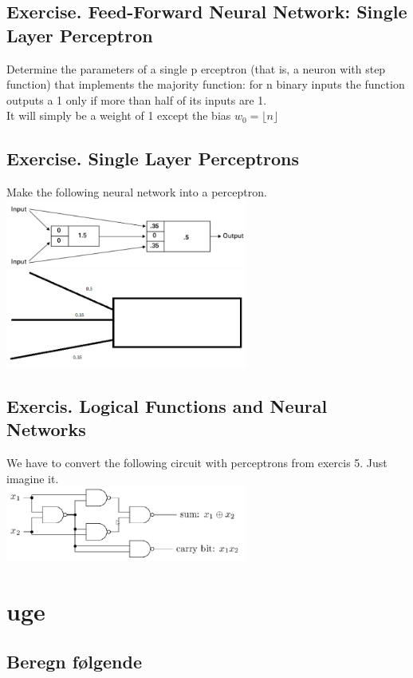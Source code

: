 \documentclass[12pt, a4paper]{article}
\begin{document}
		\subsection{Exercise. Feed-Forward Neural Network: Single Layer Perceptron}
			Determine the parameters of a single p erceptron (that is, a neuron with step function) that implements the majority function: for n binary inputs the function outputs a 1 only if more than half of its inputs are 1.\\
			It will simply be a weight of 1 except the bias $w_0=\lfloor n \rfloor$
		\subsection{Exercise. Single Layer Perceptrons}
			Make the following neural network into a perceptron.\\
			\includegraphics[width=300px]{images/41,1,5.png}\\
			\includegraphics[width=300px]{images/41,1,5,1.png}
		\subsection{Exercis. Logical Functions and Neural Networks}
			We have to convert the following circuit with perceptrons from exercis 5. Just imagine it.\\
			\includegraphics[width=300px]{images/41,1,6.png}
	\setcounter{section}{42}
	\section{uge}
		\subsection{Beregn følgende}
\end{document}
